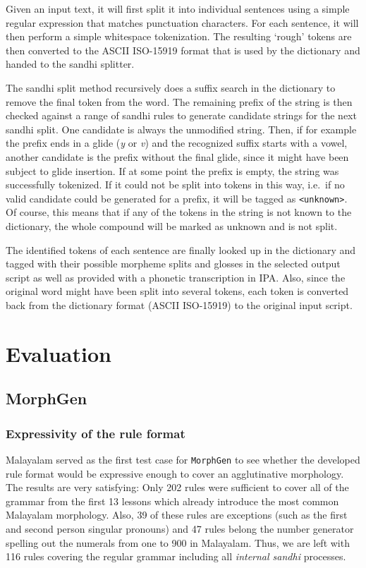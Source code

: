 \documentclass[a4paper]{article}
\newcommand{\typ}[1]{\texttt{#1}}
\begin{document}
Given an input text, it will first split it into individual sentences using a simple regular expression that matches punctuation characters. For each sentence, it will then perform a simple whitespace tokenization. The resulting `rough' tokens are then converted to the ASCII ISO-15919 format that is used by the dictionary and handed to the sandhi splitter.

The sandhi split method recursively does a suffix search in the dictionary to remove the final token from the word. The remaining prefix of the string is then checked against a range of sandhi rules to generate candidate strings for the next sandhi split. One candidate is always the unmodified string. Then, if for example the prefix ends in a glide (\textit{y} or \textit{v}) and the recognized suffix starts with a vowel, another candidate is the prefix without the final glide, since it might have been subject to glide insertion. If at some point the prefix is empty, the string was successfully tokenized. If it could not be split into tokens in this way, i.e.\ if no valid candidate could be generated for a prefix, it will be tagged as \typ{<unknown>}. Of course, this means that if any of the tokens in the string is not known to the dictionary, the whole compound will be marked as unknown and is not split.

The identified tokens of each sentence are finally looked up in the dictionary and tagged with their possible morpheme splits and glosses in the selected output script as well as provided with a phonetic transcription in IPA. Also, since the original word might have been split into several tokens, each token is converted back from the dictionary format (ASCII ISO-15919) to the original input script.


\section{Evaluation}\label{sec:eval}

\subsection{MorphGen}

\subsubsection{Expressivity of the rule format}

Malayalam served as the first test case for \typ{MorphGen} to see whether the developed rule format would be expressive enough to cover an agglutinative morphology. The results are very satisfying: Only 202 rules were sufficient to cover all of the grammar from the first 13 \textcite{moag} lessons which already introduce the most common Malayalam morphology. Also, 39 of these rules are exceptions (such as the first and second person singular pronouns) and 47 rules belong the number generator spelling out the numerals from one to 900 in Malayalam. Thus, we are left with 116 rules covering the regular grammar including all \textit{internal sandhi} processes.
\end{document}
